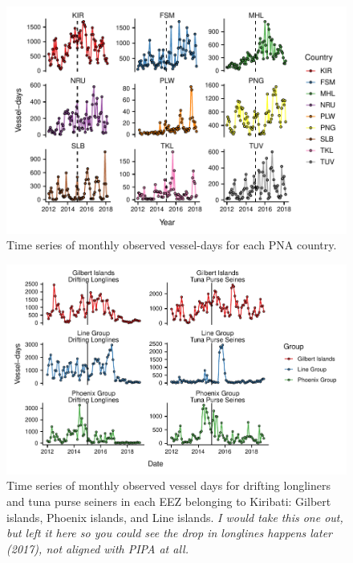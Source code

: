\documentclass[9p,twocolumn,twoside,lineno]{pnas-new}
\begin{document}
\begin{figure}[H]
\centering
\includegraphics{img/PS_VDS_PNA_by_month_eez.pdf}
\caption{\label{PS_VDS_PNA_by_month_eez}Time series of monthly observed vessel-days for each PNA country.}
\end{figure}

\begin{figure}[H]
\centering
\includegraphics{img/time_series_gear_group.pdf}
\caption{\label{fig:time_series_gear_group}Time series of monthly observed vessel days for drifting longliners and tuna purse seiners in each EEZ belonging to Kiribati: Gilbert islands, Phoenix islands, and Line islands. \emph{I would take this one out, but left it here so you could see the drop in longlines happens later (2017), not aligned with PIPA at all.}}
\end{figure}
\end{document}
